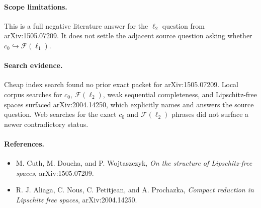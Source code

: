 \documentclass[11pt]{article}
\newcommand{\Free}{\mathcal F}
\begin{document}
\paragraph{Scope limitations.}
This is a full negative literature answer for the \(\ell_2\) question from
arXiv:1505.07209. It does not settle the adjacent source question asking
whether \(c_0\hookrightarrow \Free(\ell_1)\).

\paragraph{Search evidence.}
Cheap index search found no prior exact packet for arXiv:1505.07209. Local
corpus searches for \(c_0\), \(\Free(\ell_2)\), weak sequential completeness,
and Lipschitz-free spaces surfaced arXiv:2004.14250, which explicitly names
and answers the source question. Web searches for the exact \(c_0\) and
\(\Free(\ell_2)\) phrases did not surface a newer contradictory status.

\paragraph{References.}
\begin{itemize}
\item M. Cuth, M. Doucha, and P. Wojtaszczyk, \emph{On the structure of Lipschitz-free spaces}, arXiv:1505.07209.
\item R. J. Aliaga, C. Nous, C. Petitjean, and A. Prochazka, \emph{Compact reduction in Lipschitz free spaces}, arXiv:2004.14250.
\end{itemize}
\end{document}
